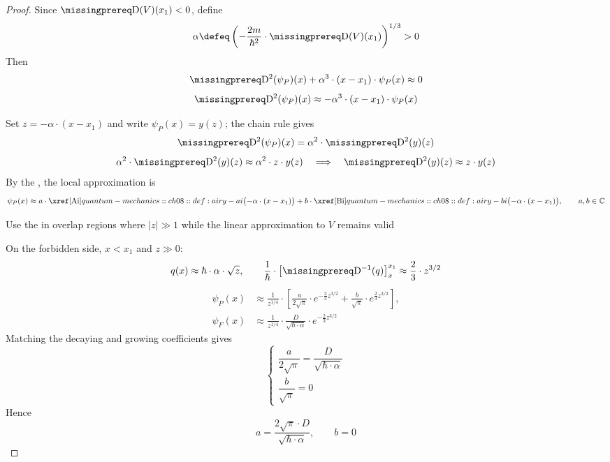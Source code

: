 \documentclass[12pt]{article}
\begin{document}
\begin{proof}
  Since $\DiffOp(V)(x_1)<0$, define
  \[
    \alpha\defeq\left(-\frac{2m}{\hbar^2}\cdot\DiffOp(V)(x_1)\right)^{1/3}>0
  \]
  Then
  \[
    \DiffOp^2(\psi_P)(x)+\alpha^3\cdot(x-x_1)\cdot\psi_P(x)\approx0
  \]
  \[
    \DiffOp^2(\psi_P)(x)\approx-\alpha^3\cdot(x-x_1)\cdot\psi_P(x)
  \]

  Set $z=-\alpha\cdot(x-x_1)$ and write $\psi_P(x)=y(z)$; the chain rule gives
  \[
    \DiffOp^2(\psi_P)(x)=\alpha^2\cdot\DiffOp^2(y)(z)
  \]
  \[
    \alpha^2\cdot\DiffOp^2(y)(z)
    \approx\alpha^2\cdot z\cdot y(z)
    \quad\Longrightarrow\quad
    \DiffOp^2(y)(z)\approx z\cdot y(z)
  \]
  By the , the local approximation is
  \[
    \psi_P(x)\approx
    a\cdot\AiryAi\bigl(-\alpha\cdot(x-x_1)\bigr)
    +b\cdot\AiryBi\bigl(-\alpha\cdot(x-x_1)\bigr),
    \qquad a,b\in\mathbb C
  \]

  Use the  in overlap regions where $|z|\gg1$ while the linear approximation to $V$ remains valid

  On the forbidden side, $x<x_1$ and $z\gg0$:
  \[
    q(x)\approx\hbar\cdot\alpha\cdot\sqrt z,
    \qquad
    \frac1\hbar\cdot\left[\DiffOp^{-1}(q)\right]_x^{x_1}
    \approx\frac23\cdot z^{3/2}
  \]
  \[
    \begin{aligned}
      \psi_P(x)&\approx\frac1{z^{1/4}}\cdot\left[
        \frac{a}{2\sqrt\pi}\cdot e^{-\frac23 z^{3/2}}
        +\frac{b}{\sqrt\pi}\cdot e^{\frac23 z^{3/2}}\right],\\
      \psi_F(x)&\approx\frac1{z^{1/4}}\cdot
        \frac{D}{\sqrt{\hbar\cdot\alpha}}\cdot e^{-\frac23 z^{3/2}}
    \end{aligned}
  \]
  Matching the decaying and growing coefficients gives
  \[
    \begin{cases}
      \dfrac{a}{2\sqrt\pi}=\dfrac{D}{\sqrt{\hbar\cdot\alpha}}\\[0.5em]
      \dfrac{b}{\sqrt\pi}=0
    \end{cases}
  \]
  Hence
  \[
    a=\frac{2\sqrt\pi\cdot D}{\sqrt{\hbar\cdot\alpha}},\qquad b=0
  \]


\end{proof}
\end{document}
